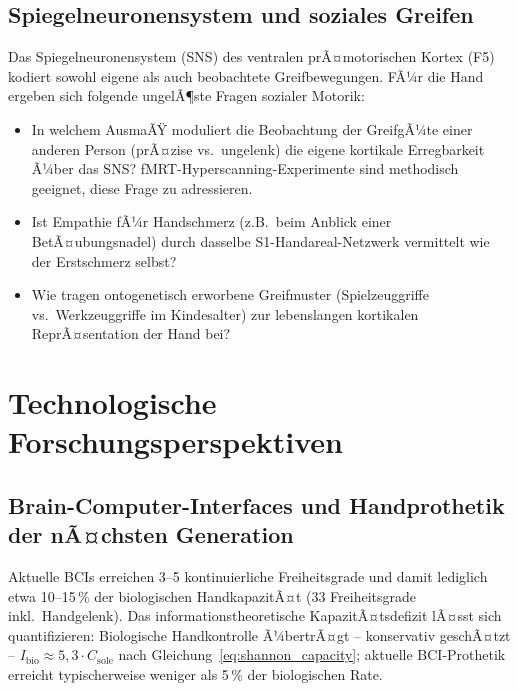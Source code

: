 ﻿\documentclass[12pt,a4paper]{report}
\theoremstyle{plain}
\theoremstyle{definition}
\theoremstyle{remark}
\begin{document}
\subsection{Spiegelneuronensystem und soziales Greifen}

Das Spiegelneuronensystem (SNS) des ventralen prÃ¤motorischen Kortex (F5)
kodiert sowohl eigene als auch beobachtete Greifbewegungen. FÃ¼r die Hand
ergeben sich folgende ungelÃ¶ste Fragen sozialer Motorik:

\begin{itemize}
\item In welchem AusmaÃŸ moduliert die Beobachtung der GreifgÃ¼te einer
  anderen Person (prÃ¤zise vs.\ ungelenk) die eigene kortikale Erregbarkeit
  Ã¼ber das SNS? fMRT-Hyperscanning-Experimente sind methodisch geeignet,
  diese Frage zu adressieren.
\item Ist Empathie fÃ¼r Handschmerz (z.B.\ beim Anblick einer
  BetÃ¤ubungsnadel) durch dasselbe S1-Handareal-Netzwerk vermittelt
  wie der Erstschmerz selbst?
\item Wie tragen ontogenetisch erworbene Greifmuster (Spielzeuggriffe vs.\
  Werkzeuggriffe im Kindesalter) zur lebenslangen kortikalen
  ReprÃ¤sentation der Hand bei?
\end{itemize}

\section{Technologische Forschungsperspektiven}

\subsection{Brain-Computer-Interfaces und Handprothetik der nÃ¤chsten Generation}

Aktuelle BCIs erreichen 3--5 kontinuierliche Freiheitsgrade und damit
lediglich etwa 10--15\,\% der biologischen HandkapazitÃ¤t (33 Freiheitsgrade
inkl.\ Handgelenk). Das informationstheoretische KapazitÃ¤tsdefizit
lÃ¤sst sich quantifizieren: Biologische Handkontrolle Ã¼bertrÃ¤gt --
konservativ geschÃ¤tzt -- $I_{\mathrm{bio}} \approx 5{,}3 \cdot
C_{\mathrm{sole}}$ nach Gleichung~\eqref{eq:shannon_capacity};
aktuelle BCI-Prothetik erreicht typischerweise weniger als 5\,\%
der biologischen Rate.
\end{document}
